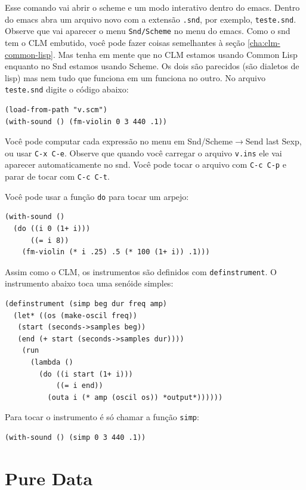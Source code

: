 \documentclass[12pt,brazil]{book}
\newcommand{\sep}{$\rightarrow$}
\begin{document}
Esse comando vai abrir o scheme e um modo interativo dentro do emacs.
Dentro do emacs abra um arquivo novo com a extensão \texttt{.snd}, por
exemplo, \texttt{teste.snd}. Observe que vai aparecer o menu
\texttt{Snd/Scheme} no menu do emacs. Como o snd tem o CLM embutido,
você pode fazer coisas semelhantes à seção \ref{cha:clm-common-lisp}.
Mas tenha em mente que no CLM estamos usando Common Lisp enquanto no
Snd estamos usando Scheme. Os dois são parecidos (são dialetos de
lisp) mas nem tudo que funciona em um funciona no outro. No arquivo
\texttt{teste.snd} digite o código abaixo:

\begin{verbatim}
(load-from-path "v.scm")
(with-sound () (fm-violin 0 3 440 .1))
\end{verbatim}

Você pode computar cada expressão no menu em Snd/Scheme\sep Send last
Sexp, ou usar \texttt{C-x C-e}. Observe que quando você carregar o
arquivo \texttt{v.ins} ele vai aparecer automaticamente no snd. Você
pode tocar o arquivo com \texttt{C-c C-p} e parar de tocar com
\texttt{C-c C-t}.

Você pode usar a função \texttt{do} para tocar um arpejo:

\begin{verbatim}
(with-sound ()
  (do ((i 0 (1+ i)))
      ((= i 8))
    (fm-violin (* i .25) .5 (* 100 (1+ i)) .1)))
\end{verbatim}

Assim como o CLM, os instrumentos são definidos com
\texttt{definstrument}. O instrumento abaixo toca uma senóide simples:

\begin{verbatim}
(definstrument (simp beg dur freq amp)
  (let* ((os (make-oscil freq))
   (start (seconds->samples beg))
   (end (+ start (seconds->samples dur))))
    (run
      (lambda ()
        (do ((i start (1+ i))) 
            ((= i end))
          (outa i (* amp (oscil os)) *output*))))))
\end{verbatim}

Para tocar o instrumento é só chamar a função \texttt{simp}:

\begin{verbatim}
(with-sound () (simp 0 3 440 .1))
\end{verbatim}

\chapter{Pure Data}
\label{cha:pure-data}
\end{document}
